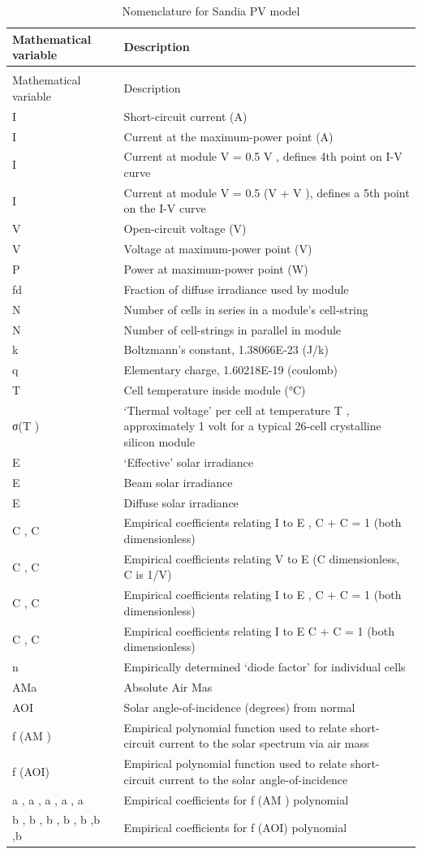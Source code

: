 \begin{longtable}[c]{p{1.5in}p{4.5in}}
\caption{Nomenclature for Sandia PV model \label{table:nomenclature-for-sandia-pv-model}} \tabularnewline
\toprule 
Mathematical variable & Description \tabularnewline
\midrule
\endfirsthead

\caption[]{Nomenclature for Sandia PV model} \tabularnewline
\toprule 
Mathematical variable & Description \tabularnewline
\midrule
\endhead

I & Short-circuit current (A) \tabularnewline
I & Current at the maximum-power point (A) \tabularnewline
I & Current at module V = 0.5 V  , defines 4th point on I-V curve \tabularnewline
I & Current at module V = 0.5 (V   + V  ), defines a 5th point on the I-V curve \tabularnewline
V & Open-circuit voltage (V) \tabularnewline
V & Voltage at maximum-power point (V) \tabularnewline
P & Power at maximum-power point (W) \tabularnewline
fd & Fraction of diffuse irradiance used by module \tabularnewline
N & Number of cells in series in a module’s cell-string \tabularnewline
N & Number of cell-strings in parallel in module \tabularnewline
k & Boltzmann’s constant, 1.38066E-23 (J/k) \tabularnewline
q & Elementary charge, 1.60218E-19 (coulomb) \tabularnewline
T & Cell temperature inside module (°C) \tabularnewline
σ(T  ) & ‘Thermal voltage’ per cell at temperature T  , approximately 1 volt for a typical 26-cell crystalline silicon module \tabularnewline
E & ‘Effective’ solar irradiance \tabularnewline
E & Beam solar irradiance \tabularnewline
E & Diffuse solar irradiance \tabularnewline
C   , C & Empirical coefficients relating I   to E   , C   + C   = 1 (both dimensionless) \tabularnewline
C   , C & Empirical coefficients relating V   to E  (C   dimensionless, C   is 1/V) \tabularnewline
C   , C & Empirical coefficients relating I   to E  , C   + C   = 1 (both dimensionless) \tabularnewline
C   , C & Empirical coefficients relating I   to E   C   + C   = 1 (both dimensionless) \tabularnewline
n & Empirically determined ‘diode factor’ for individual cells \tabularnewline
AMa & Absolute Air Mas \tabularnewline
AOI & Solar angle-of-incidence (degrees) from normal \tabularnewline
f  (AM  ) & Empirical polynomial function used to relate short-circuit current to the solar spectrum via air mass \tabularnewline
f  (AOI) & Empirical polynomial function used to relate short-circuit current to the solar angle-of-incidence \tabularnewline
a  , a  , a  , a  , a & Empirical coefficients for f  (AM  ) polynomial \tabularnewline
b  , b  , b  , b  , b  ,b  ,b & Empirical coefficients for f  (AOI) polynomial \tabularnewline

\end{longtable}
